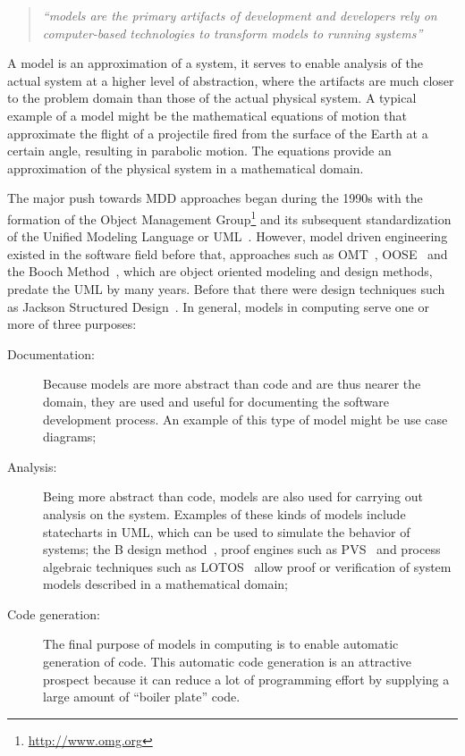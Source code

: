 \begin{quote}
\emph{``models are the primary artifacts of development and developers
  rely on computer-based technologies to transform models to running
  systems''}
\end{quote}

A model is an approximation of a system, it serves to enable analysis
of the actual system at a higher level of abstraction, where the
artifacts are much closer to the problem domain than those of the
actual physical system. A typical example of a model might be the
mathematical equations of motion that approximate the flight of a
projectile fired from the surface of the Earth at a certain angle,
resulting in parabolic motion. The equations provide an approximation
of the physical system in a mathematical domain.

The major push towards MDD approaches began during the 1990s with the
formation of the Object Management
Group\footnote{\url{http://www.omg.org}} and its subsequent
standardization of the Unified Modeling Language or
UML~\cite{uml-super}. However, model driven engineering existed in the
software field before that, approaches such as
OMT~\cite{bruegge@oopsla92}, OOSE~\cite{jacobson-oose} and the Booch
Method~\cite{white-booch}, which are object oriented modeling and
design methods, predate the UML by many years. Before that there were
design techniques such as Jackson Structured
Design~\cite{jackson-jsd}. In general, models in computing serve one
or more of three purposes:

\begin{description}
\item[Documentation:]{Because models are more abstract than code and
  are thus nearer the domain, they are used and useful for documenting
  the software development process. An example of this type of model
  might be use case diagrams;}
\item[Analysis:]{Being more abstract than code, models are also used
  for carrying out analysis on the system. Examples of these kinds of
  models include statecharts in UML, which can be used to simulate the
  behavior of systems; the B design method~\cite{abrial@vdm91,
    sorensen-B}, proof engines such as PVS~\cite{owre@cav96} and
  process algebraic techniques such as LOTOS~\cite{garavel@cav07}
  allow proof or verification of system models described in a
  mathematical domain;}
\item[Code generation:]{The final purpose of models in computing is to
  enable automatic generation of code. This automatic code generation
  is an attractive prospect because it can reduce a lot of programming
  effort by supplying a large amount of ``boiler plate'' code.}
\end{description}

